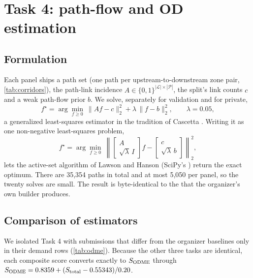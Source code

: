 \section{Task 4: path-flow and OD estimation}\label{sec:odme}

\subsection{Formulation}
Each panel ships a path set (one path per upstream-to-downstream zone pair, \cref{tab:corridors}), the path-link
incidence $A\in\{0,1\}^{|\mathcal L|\times|\mathcal P|}$, the split's link counts $c$ and a weak path-flow prior $b$.
We solve, separately for validation and for private,
\begin{equation}
  f^\star = \arg\min_{f\ge 0}\ \lVert Af-c\rVert_2^2 + \lambda\,\lVert f-b\rVert_2^2,\qquad \lambda=0.05,
  \label{eq:odme}
\end{equation}
a generalized least-squares estimator in the tradition of Cascetta \cite{cascetta1984}. Writing it as one
non-negative least-squares problem,
\begin{equation}
  f^\star = \arg\min_{f\ge0}\ \left\lVert \begin{bmatrix} A\\ \sqrt\lambda\, I\end{bmatrix} f -
  \begin{bmatrix} c\\ \sqrt\lambda\, b\end{bmatrix}\right\rVert_2^2 ,
  \label{eq:nnls}
\end{equation}
lets the active-set algorithm of Lawson and Hanson \cite{lawson1974} (SciPy's  \cite{virtanen2020}) return
the exact optimum. There are 35,354 paths in total and at most 5,050 per panel, so the twenty solves are small.
The result is byte-identical to the  that the organizer's own builder produces.

\subsection{Comparison of estimators}
We isolated Task 4 with submissions that differ from the organizer baselines only in their demand rows
(\cref{tab:odme}). Because the other three tasks are identical, each composite score converts exactly to $S_{\mathrm{ODME}}$
through $S_{\mathrm{ODME}} = 0.8359 + (S_{\mathrm{total}} - 0.55343)/0.20$.

